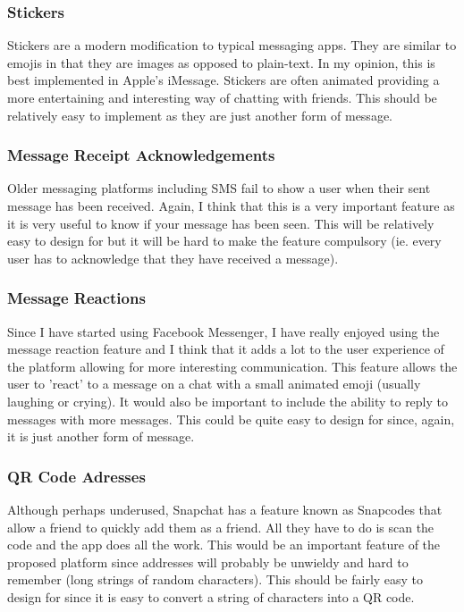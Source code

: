 \documentclass{article}
\begin{document}
\subsubsection{Stickers}
Stickers are a modern modification to typical messaging apps. They are similar to emojis in that they are images as opposed to plain-text. In my opinion, this is best implemented in Apple's iMessage. Stickers are often animated providing a more entertaining and interesting way of chatting with friends. This should be relatively easy to implement as they are just another form of message.

\subsubsection{Message Receipt Acknowledgements}
Older messaging platforms including SMS fail to show a user when their sent message has been received. Again, I think that this is a very important feature as it is very useful to know if your message has been seen. This will be relatively easy to design for but it will be hard to make the feature compulsory (ie. every user has to acknowledge that they have received a message).

\subsubsection{Message Reactions}
Since I have started using Facebook Messenger, I have really enjoyed using the message reaction feature and I think that it adds a lot to the user experience of the platform allowing for more interesting communication. This feature allows the user to 'react' to a message on a chat with a small animated emoji (usually laughing or crying). It would also be important to include the ability to reply to messages with more messages. This could be quite easy to design for since, again, it is just another form of message.

\subsubsection{QR Code Adresses}
Although perhaps underused, Snapchat has a feature known as Snapcodes that allow a friend to quickly add them as a friend. All they have to do is scan the code and the app does all the work. This would be an important feature of the proposed platform since addresses will probably be unwieldy and hard to remember (long strings of random characters). This should be fairly easy to design for since it is easy to convert a string of characters into a QR code.
\end{document}
